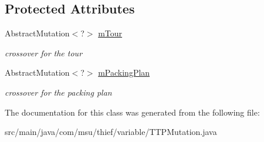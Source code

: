 \subsection*{Protected Attributes}
\begin{DoxyCompactItemize}
\item 
\hypertarget{classcom_1_1msu_1_1thief_1_1variable_1_1TTPMutation_ace8bf1825ff37a4e0a4bdfa1ac581924}{Abstract\-Mutation$<$?$>$ \hyperlink{classcom_1_1msu_1_1thief_1_1variable_1_1TTPMutation_ace8bf1825ff37a4e0a4bdfa1ac581924}{m\-Tour}}\label{classcom_1_1msu_1_1thief_1_1variable_1_1TTPMutation_ace8bf1825ff37a4e0a4bdfa1ac581924}

\begin{DoxyCompactList}\small\item\em crossover for the tour \end{DoxyCompactList}\item 
\hypertarget{classcom_1_1msu_1_1thief_1_1variable_1_1TTPMutation_ad49e8ad884aad46fdc8724fd1e168f64}{Abstract\-Mutation$<$?$>$ \hyperlink{classcom_1_1msu_1_1thief_1_1variable_1_1TTPMutation_ad49e8ad884aad46fdc8724fd1e168f64}{m\-Packing\-Plan}}\label{classcom_1_1msu_1_1thief_1_1variable_1_1TTPMutation_ad49e8ad884aad46fdc8724fd1e168f64}

\begin{DoxyCompactList}\small\item\em crossover for the packing plan \end{DoxyCompactList}\end{DoxyCompactItemize}


The documentation for this class was generated from the following file\-:\begin{DoxyCompactItemize}
\item 
src/main/java/com/msu/thief/variable/T\-T\-P\-Mutation.\-java\end{DoxyCompactItemize}
